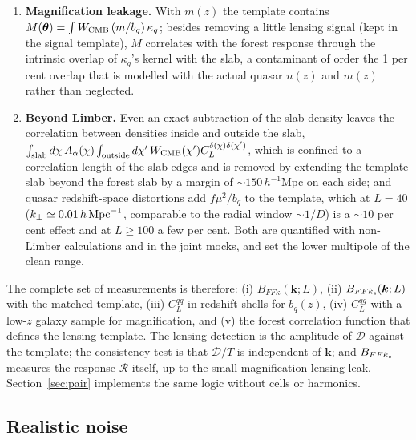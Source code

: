 \documentclass[11pt,a4paper]{article}
\newcommand{\vth}{\bm{\theta}}
\begin{document}
\begin{enumerate}
\item \textbf{Magnification leakage.} With $m(z)$ the template contains $M(\vth)=\int W_{\rm CMB}\,(m/b_q)\,\kappa_q$; besides removing a little lensing signal (kept in the signal template), $M$ correlates with the forest response through the intrinsic overlap of $\kappa_q$'s kernel with the slab, a contaminant of order the 1 per cent overlap that is modelled with the actual quasar $n(z)$ and $m(z)$ rather than neglected.
\item \textbf{Beyond Limber.} Even an exact subtraction of the slab density leaves the correlation between densities inside and outside the slab, $\int_{\rm slab}d\chi\,A_\alpha(\chi)\int_{\rm outside}d\chi'\,W_{\rm CMB}(\chi')C_L^{\delta(\chi)\delta(\chi')}$, which is confined to a correlation length of the slab edges and is removed by extending the template slab beyond the forest slab by a margin of $\sim150\,h^{-1}$Mpc on each side; and quasar redshift-space distortions add $f\mu^2/b_q$ to the template, which at $L=40$ ($k_\perp\simeq0.01\,h\,{\rm Mpc}^{-1}$, comparable to the radial window $\sim1/D$) is a $\sim10$ per cent effect and at $L\ge100$ a few per cent. Both are quantified with non-Limber calculations and in the joint mocks, and set the lower multipole of the clean range.
\end{enumerate}
The complete set of measurements is therefore: (i) $B_{FF\kappa}(\bm k;L)$, (ii) $B_{FF\hat\kappa_{\rm s}}(\bm k;L)$ with the matched template, (iii) $C_L^{qq}$ in redshift shells for $b_q(z)$, (iv) $C_L^{qg}$ with a low-$z$ galaxy sample for magnification, and (v) the forest correlation function that defines the lensing template. The lensing detection is the amplitude of $\mathcal D$ against the template; the consistency test is that $\mathcal D/T$ is independent of $\bm k$; and $B_{FF\hat\kappa_{\rm s}}$ measures the response $\mathcal R$ itself, up to the small magnification-lensing leak. Section~\ref{sec:pair} implements the same logic without cells or harmonics.

\subsection{Realistic noise}
\label{sec:three-noise}
\end{document}

